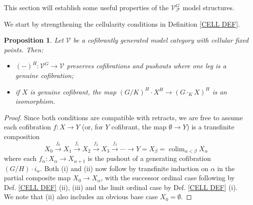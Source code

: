 \documentclass[a4paper,10pt
,draft
]{article}%
\numberwithin{equation}{section}
\numberwithin{figure}{section}
\newtheorem{proposition}[equation]{Proposition}%
\theoremstyle{definition} %
\DeclareMathOperator{\colim}{colim}%
\newcommand{\1}{\ensuremath{\mathbbm 1}}%
\begin{document}
This section will establish some useful properties of the $\mathcal{V}^G_{\mathcal{F}}$ model structures.

We start by strengthening the 
cellularity conditions in Definition \ref{CELL DEF}.

\begin{proposition}\label{STRONGCELL PROP}
	Let $\mathcal{V}$ be a cofibrantly generated model category with cellular fixed points. Then:
	\begin{itemize}
		\item[(i)] $(\minus)^H \colon \mathcal{V}^G \to \mathcal{V}$ preserves cofibrations and pushouts where one leg
			 is a genuine cofibration;
		\item[(ii)] if $X$ is genuine cofibrant, the map 
			$(G/K)^H \cdot X^H \to (G \cdot_K X)^H$ is an isomorphism.
	\end{itemize}
\end{proposition}


\begin{proof}
Since both conditions are compatible with retracts, 
we are free to assume each cofibration $f\colon X \to Y$
(or, for $Y$ cofibrant, the map $\emptyset \to Y$)
is a transfinite composition
\begin{equation}\label{TRANSFCOMP EQ}
	X_0 \xrightarrow{f_0} 
	X_1 \xrightarrow{f_1}
	X_2 \xrightarrow{f_2}
	X_3 \xrightarrow{f_3} 
	\cdots
	\to Y = X_{\beta} = \colim_{\alpha < \beta} X_{\alpha}
\end{equation}
where each $f_{\alpha} \colon X_{\alpha} \to X_{\alpha+1}$
is the pushout of a generating cofibration
$(G/H) \cdot i_{\alpha}$. Both (i) and (ii) now follow by transfinite induction on $\alpha$ in the partial composite map
$X_0 \to X_{\alpha}$, with the successor ordinal case following by Def. \ref{CELL DEF} (ii), (iii) and the limit ordinal case by
Def. \ref{CELL DEF} (i). We note that (ii) also includes an obvious base case $X_0=\emptyset$.
\end{proof}
\end{document}
